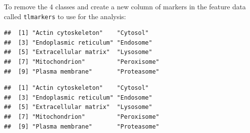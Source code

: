 To remove the 4 classes and create a new column of markers in the
feature data called \texttt{tlmarkers} to use for the analysis:



\begin{knitrout}
\color{fgcolor}\begin{kframe}
\begin{alltt}
\hlopt{$} \hlkwb{<-} \hlopt{$}
\hlopt{$} \hlkwb{<-} \hlopt{$}

  \hlkwb{<-} \hlstd{(}\hlstd{,} \hlstd{,}
           \hlstd{,}
           \hlstd{)}
   
   \hlkwb{<-}     \hlstd{=} \hlstd{)}
   \hlkwb{<-}     \hlstd{=} \hlstd{)}
\hlstd{\}}
  \hlstd{=} \hlstd{)}
\end{alltt}
\begin{verbatim}
##  [1] "Actin cytoskeleton"    "Cytosol"              
##  [3] "Endoplasmic reticulum" "Endosome"             
##  [5] "Extracellular matrix"  "Lysosome"             
##  [7] "Mitochondrion"         "Peroxisome"           
##  [9] "Plasma membrane"       "Proteasome"
\end{verbatim}
\begin{alltt}
  \hlstd{=} \hlstd{)}
\end{alltt}
\begin{verbatim}
##  [1] "Actin cytoskeleton"    "Cytosol"              
##  [3] "Endoplasmic reticulum" "Endosome"             
##  [5] "Extracellular matrix"  "Lysosome"             
##  [7] "Mitochondrion"         "Peroxisome"           
##  [9] "Plasma membrane"       "Proteasome"
\end{verbatim}
\end{kframe}
\end{knitrout}

